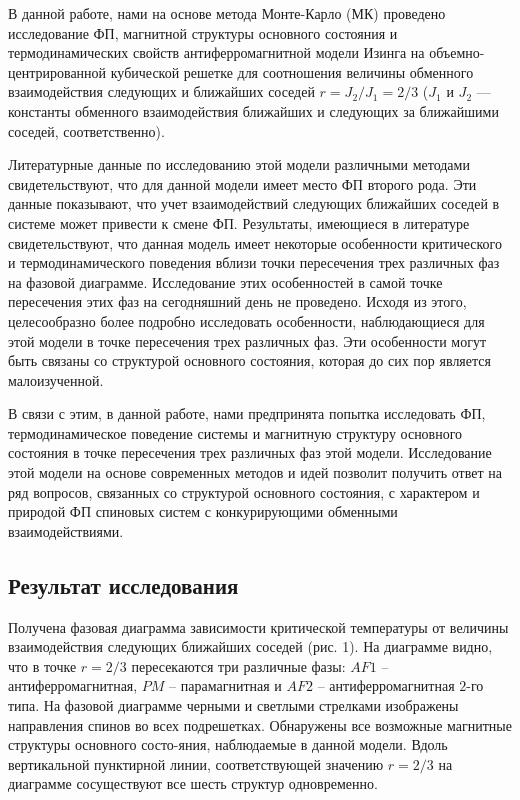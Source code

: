 В данной работе, нами на основе метода Монте-Карло (МК) проведено исследование ФП, магнитной структуры основного состояния и термодинамических свойств антиферромагнитной модели Изинга на объемно-центрированной кубической решетке для соотношения величины обменного взаимодействия следующих и ближайших соседей $r=J_2/J_1=2/3$ ($J_1$ и $J_2$ --- константы обменного взаимодействия ближайших и следующих за ближайшими соседей, соответственно).

Литературные данные по исследованию этой модели различными методами свидетельствуют, что для данной модели имеет место ФП второго рода. Эти данные показывают, что учет взаимодействий следующих ближайших соседей в системе может привести к смене ФП. Результаты, имеющиеся в литературе свидетельствуют, что данная модель имеет некоторые особенности критического и термодинамического поведения вблизи точки пересечения трех различных фаз на фазовой диаграмме. Исследование этих особенностей в самой точке пересечения этих фаз на сегодняшний день не проведено. Исходя из этого, целесообразно более подробно исследовать особенности, наблюдающиеся для этой модели в точке пересечения трех различных фаз. Эти особенности могут быть связаны со структурой основного состояния, которая до сих пор является малоизученной.

В связи с этим, в данной работе, нами предпринята попытка исследовать ФП, термодинамическое поведение системы и магнитную структуру основного состояния в точке пересечения трех различных фаз этой модели. Исследование этой модели на основе современных методов и идей позволит получить ответ на ряд вопросов, связанных со структурой основного состояния, с характером и природой ФП спиновых систем с конкурирующими обменными взаимодействиями.



\subsection{Результат исследования}



Получена фазовая диаграмма зависимости критической температуры от величины взаимодействия следующих ближайших соседей (рис. 1). На диаграмме видно, что в точке $r=2/3$ пересекаются три различные фазы: $AF1$ -- антиферромагнитная, $PM$ -- парамагнитная и $AF2$ -- антиферромагнитная $2$-го типа. На фазовой диаграмме черными и светлыми стрелками изображены направления спинов во всех подрешетках. Обнаружены все возможные магнитные структуры основного состо-яния, наблюдаемые в данной модели. Вдоль вертикальной пунктирной линии, соответствующей значению $r=2/3$ на диаграмме сосуществуют все шесть структур одновременно.

